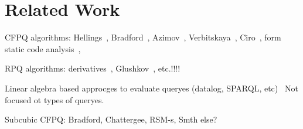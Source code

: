 \section{Related Work}

CFPQ algorithms: Hellings~\cite{!!!}, Bradford~\cite{!!!}, Azimov~\cite{!!!}, Verbitskaya~\cite{!!!}, Ciro~\cite{!!!}, form static code analysis~\cite{!!!}, 

RPQ algorithms: derivatives~\cite{!!!}, Glushkov~\cite{!!!}, etc.!!!!~\cite{!!!}

Linear algebra based approcges to evaluate queryes (datalog, SPARQL, etc)~\cite{!!!} Not focused ot types of queryes.

Subcubic CFPQ: Bradford, Chattergee, RSM-s, Smth else?